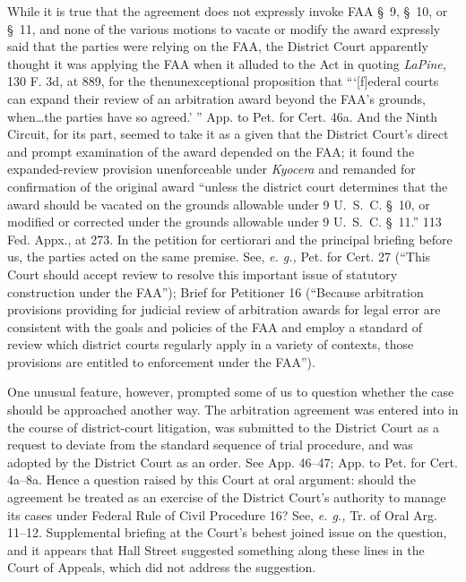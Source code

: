   While it is true that the agreement does not expressly invoke FAA
\S~9, \S~10, or \S~11, and none of the various motions to vacate or
modify the award expressly said that the parties were relying on the
FAA, the District Court apparently thought it was applying the FAA when
it alluded to the Act in quoting \emph{LaPine,} 130 F. 3d, at 889,
for the thenunexceptional proposition that ``‘[f]ederal courts can
expand \newpage  their review of an arbitration award beyond the FAA's
grounds, when\dots the parties have so agreed.' '' App. to Pet.
for Cert. 46a. And the Ninth Circuit, for its part, seemed to take it
as a given that the District Court's direct and prompt examination of
the award depended on the FAA; it found the expanded-review provision
unenforceable under \emph{Kyocera} and remanded for confirmation of the
original award ``unless the district court determines that the award
should be vacated on the grounds allowable under 9 U.~S.~C. \S~10,
or modified or corrected under the grounds allowable under 9 U.~S.~C.
\S~11.'' 113 Fed. Appx., at 273. In the petition for certiorari
and the principal briefing before us, the parties acted on the same
premise. See, \emph{e. g.,} Pet. for Cert. 27 (``This Court should
accept review to resolve this important issue of statutory construction
under the FAA''); Brief for Petitioner 16 (``Because arbitration
provisions providing for judicial review of arbitration awards for legal
error are consistent with the goals and policies of the FAA and employ
a standard of review which district courts regularly apply in a variety
of contexts, those provisions are entitled to enforcement under the
FAA'').

  One unusual feature, however, prompted some of us to question whether
the case should be approached another way. The arbitration agreement was
entered into in the course of district-court litigation, was submitted
to the District Court as a request to deviate from the standard sequence
of trial procedure, and was adopted by the District Court as an order.
See App. 46--47; App. to Pet. for Cert. 4a--8a. Hence a question
raised by this Court at oral argument: should the agreement be treated
as an exercise of the District Court's authority to manage its cases
under Federal Rule of Civil Procedure 16? See, \emph{e. g.,} Tr. of
Oral Arg. 11--12. Supplemental briefing at the Court's behest
joined issue on the question, and it appears that Hall Street suggested
something along these lines in the Court of Appeals, which did not
address the suggestion. \newpage 

